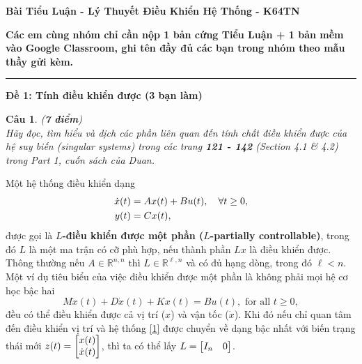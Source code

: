 \documentclass[11pt]{article}
\newtheorem{bt}{Câu}
\newcommand{\RR}{\mathbb R}
\begin{document}



\begin{center}
	{\bf Bài Tiểu Luận - Lý Thuyết Điều Khiển Hệ Thống - K64TN}
\end{center}

\textbf{Các em cùng nhóm chỉ cần nộp 1 bản cứng Tiểu Luận + 1 bản mềm vào Google Classroom, ghi tên đầy đủ các bạn trong nhóm theo mẫu thầy gửi kèm.} \\

\hrule

\begin{center}
	{\bf Đề 1: Tính điều khiển được (3 bạn làm)}
\end{center}

\begin{bt}(\textbf{7 điểm}) \\
Hãy đọc, tìm hiểu và dịch các phần liên quan đến tính chất điều khiển được của hệ suy biến (singular systems) trong các trang \textbf{121 - 142} (Section 4.1 \& 4.2) trong Part 1, cuốn sách của Duan. 
\end{bt}

Một hệ thống điều khiển dạng 
%
\begin{align}\label{0}
	\dot{x}(t) &= A x(t) + B u(t), \quad \forall t\geq 0, \\
	y(t) &=  C x(t), \notag
\end{align}
%
được gọi là \textbf{$L$-điều khiển được một phần ($L$-partially controllable)}, trong đó $L$ là một ma trận có cỡ phù hợp, nếu thành phần $Lx$ là điều khiển được.
Thông thường nếu $A \in \RR^{n,n}$ thì $L \in \RR^{\ell,n}$ và có đủ hạng dòng, trong đó $\ell < n$. Một ví dụ tiêu biểu của việc điều khiển được một phần là không phải mọi hệ cơ học bậc hai
%
\begin{equation}\label{1}
	M \ddot{x}(t) + D \dot{x}(t) + K x(t) = B u(t), \mbox{ for all } t\geq 0,
\end{equation}
%
đều có thể điều khiển được cả vị trí ($x$) và vận tốc ($\dot{x}$). Khi đó nếu chỉ quan tâm đến điều khiển vị trí và hệ thống \eqref{1} được chuyển về dạng bậc nhất với biến
trạng thái mới $z(t) = \begin{bmatrix} x(t) \\ \dot{x}(t) \end{bmatrix}$, thì ta có thể lấy $L = \begin{bmatrix} I_n & 0 \end{bmatrix}$.
\end{document}
